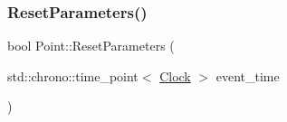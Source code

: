 \mbox{\label{classPoint_a123c78bef71f74d71bc833709a38709c}} 
\subsubsection{\texorpdfstring{Reset\+Parameters()}{ResetParameters()}}
{\footnotesize\ttfamily bool Point\+::\+Reset\+Parameters (\begin{DoxyParamCaption}\item[{std\+::chrono\+::time\+\_\+point$<$ \mbox{\hyperlink{universe_8h_a0ef8d951d1ca5ab3cfaf7ab4c7a6fd80}{Clock}} $>$}]{event\+\_\+time }\end{DoxyParamCaption})}

